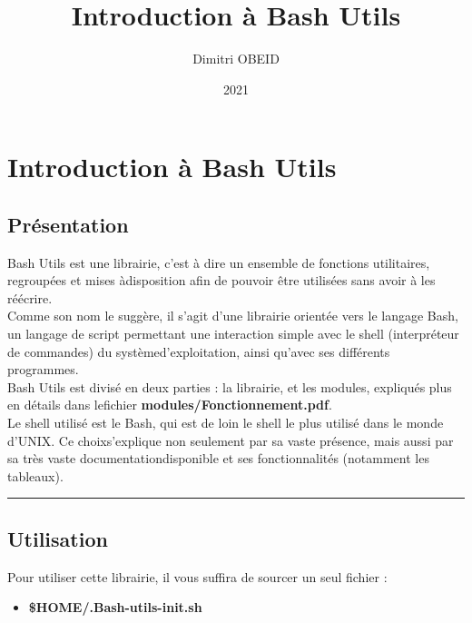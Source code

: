 \documentclass[a4paper,10pt]{article}
\title{\color{red}Introduction à Bash Utils}\color{white}
\author{Dimitri OBEID}
\date{2021}
\begin{document}
\maketitle
\newpage

\hypertarget{contents}{}
\tableofcontents
\newpage

\color{red}
\section{Introduction à Bash Utils}\color{white}

\color{green}
\subsection{Présentation}\color{white}
Bash Utils est une librairie, c'est à dire un ensemble de fonctions utilitaires, regroupées et mises à\linebreak disposition afin de pouvoir être utilisées sans avoir à les réécrire.\\[1\baselineskip]

Comme son nom le suggère, il s'agit d'une librairie orientée vers le langage Bash, un langage de script permettant une interaction simple avec le shell (interpréteur de commandes) du système\linebreak d'exploitation, ainsi qu'avec ses différents programmes.\\[1\baselineskip]

Bash Utils est divisé en deux parties : la librairie, et les modules, expliqués plus en détails dans le\linebreak fichier \textbf{\color{lime}modules/Fonctionnement.pdf\color{white}}.\\[1\baselineskip]

Le shell utilisé est le Bash, qui est de loin le shell le plus utilisé dans le monde d'UNIX. Ce choix\linebreak s'explique non seulement par sa vaste présence, mais aussi par sa très vaste documentation\linebreak disponible et ses fonctionnalités (notamment les tableaux).\\[1\baselineskip]


\color{green}\par\noindent\rule{\textwidth}{0.4pt}\color{white}

\color{green}
\subsection{Utilisation}\color{white}
Pour utiliser cette librairie, il vous suffira de sourcer un seul fichier :
\begin{itemize}
    \item \color{orange}\textbf{\$HOME\color{lime}/.Bash-utils-init.sh\color{white}}\color{white}\\[1\baselineskip]
\end{itemize}
\end{document}
